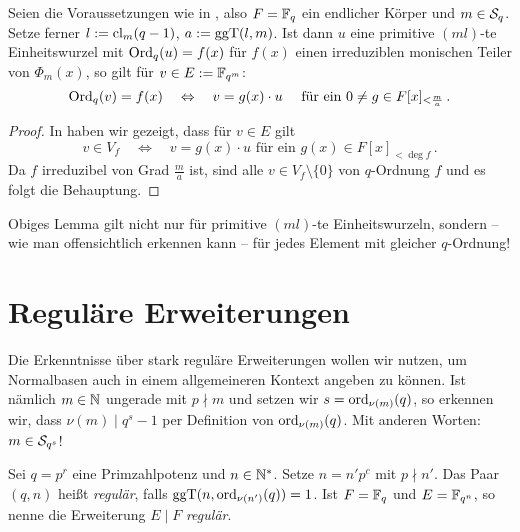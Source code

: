 \begin{lemma}
  \label{lemma:erzeuger_von_irred_teilmoduln}
  Seien die Voraussetzungen wie in , also
  $F = \F_q$ ein endlicher Körper und $m\in \S_q$. Setze ferner 
  $l := \cl_m(q-1)$, $a := \ggT(l,m)$. Ist dann $u$ eine primitive 
  $(ml)$-te Einheitswurzel mit $\Ord_q(u) = f(x)$ für $f(x)$ einen irreduziblen
  monischen Teiler von $\Phi_m(x)$, so gilt für $v \in E:= \F_{q^m}$:
  \[ \Ord_q(v) = f(x) \quad\Leftrightarrow\quad
    v = g(x) \cdot u\quad\text{ für ein } 0\neq g\in F[x]_{<\frac m a}\,.\]
\end{lemma}
\begin{proof}
  In  haben wir gezeigt, dass für $v \in E$ gilt
  \[ v \in V_f \quad\Leftrightarrow\quad v = g(x)\cdot u 
    \text{ für ein } g(x) \in F[x]_{<\deg f}\,.\]
  Da $f$ irreduzibel von Grad $\frac m a$ ist, sind alle $v \in
  V_f\setminus\{0\}$ von $q$-Ordnung $f$ und es folgt die Behauptung.
\end{proof}

\begin{bemerkung}
  Obiges Lemma gilt nicht nur für primitive $(ml)$-te Einheitswurzeln, sondern
  -- wie man offensichtlich erkennen kann -- für jedes Element mit gleicher
  $q$-Ordnung!
\end{bemerkung}




\section{Reguläre Erweiterungen}

Die Erkenntnisse über stark reguläre Erweiterungen wollen wir nutzen, um
Normalbasen auch in einem allgemeineren Kontext angeben zu können. Ist nämlich
$m\in\N$ ungerade mit $p\nmid m$ und setzen wir $s = \ord_{\nu(m)}(q)$, 
so erkennen wir, dass $\nu(m) \mid q^s-1$ per Definition von
$\ord_{\nu(m)}(q)$. Mit anderen Worten: $m \in \S_{q^s}$! 

\begin{definition}[regulär]
  Sei $q = p^r$ eine Primzahlpotenz und $n\in \N^\ast$. Setze 
  $n = n' p^c$ mit $p\nmid n'$. Das Paar $(q,n)$ heißt \emph{regulär}, falls
  $\ggT(n, \ord_{\nu(n')}(q)) = 1$. 
  Ist $F = \F_q$ und $E = \F_{q^n}$, so nenne die Erweiterung $E\mid F$ 
  \emph{regulär}.
\end{definition}

